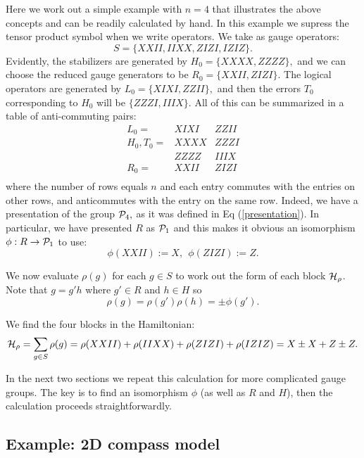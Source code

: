 \documentclass[12pt,notitlepage,longbibliography,nofootinbib,tightenlines]{revtex4}
\begin{document}
Here we work out a simple example with $n=4$
that illustrates the above concepts and can
be readily calculated by hand.
In this example we supress the tensor product
symbol when we write operators.
We take as gauge operators:
$$
    S = \{XXII, IIXX, ZIZI, IZIZ\}.
$$
Evidently, the stabilizers are generated by $H_0=\{XXXX, ZZZZ\},$
and we can choose the reduced gauge generators to be $R_0=\{XXII, ZIZI\}.$
The logical operators are generated by $L_0 = \{XIXI, ZZII\},$
and then the errors $T_0$ corresponding to $H_0$ will
be $\{ZZZI, IIIX\}.$
All of this can be summarized in a table of anti-commuting pairs:
$$
\begin{array}{rll}
L_0 = &XIXI & ZZII \\
H_0, T_0 = &XXXX & ZZZI \\
           &ZZZZ & IIIX \\
R_0 = &XXII & ZIZI \\
\end{array}
$$
where the number of rows equals $n$ and each entry
commutes with the entries on other rows, and anticommutes
with the entry on the same row. Indeed, we have a presentation
of the group $\mathcal{P}_4,$ as it was defined in Eq (\ref{presentation}).
In particular, we have presented $R$ as $\mathcal{P}_1$ and this
makes it obvious an isomorphism $\phi:R\to \mathcal{P}_1$
to use: %
$$
    \phi(XXII) := X, \ \ \phi(ZIZI) := Z.
$$

We now evaluate $\rho(g)$ for each $g\in S$ 
to work out the form of each block $\mathcal{H}_\rho$.
Note that $g=g'h$ where $g'\in R$ and $h\in H$
so 
$$\rho(g)=\rho(g')\rho(h)=\pm\phi(g').$$

We find the four blocks in the Hamiltonian:
$$
\mathcal{H}_\rho = \sum_{g\in S} \rho(g) = \rho(XXII) + \rho(IIXX) + \rho(ZIZI) + \rho(IZIZ) = X \pm X + Z \pm Z.
$$

In the next two sections we repeat this calculation for
more complicated gauge groups.
The key is to find an isomorphism $\phi$ (as well as $R$ and $H$),
then the calculation proceeds straightforwardly.

%
%

\subsection{Example: 2D compass model}
\end{document}

